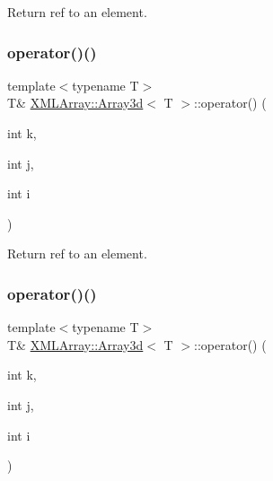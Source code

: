 Return ref to an element. 

\mbox{\label{classXMLArray_1_1Array3d_a2c17e47922ca191dbce50300c6dd6785}} 
\subsubsection{\texorpdfstring{operator()()}{operator()()}\hspace{0.1cm}{\footnotesize\ttfamily [2/6]}}
{\footnotesize\ttfamily template$<$typename T$>$ \\
T\& \mbox{\hyperlink{classXMLArray_1_1Array3d}{X\+M\+L\+Array\+::\+Array3d}}$<$ T $>$\+::operator() (\begin{DoxyParamCaption}\item[{int}]{k,  }\item[{int}]{j,  }\item[{int}]{i }\end{DoxyParamCaption})\hspace{0.3cm}{\ttfamily [inline]}}



Return ref to an element. 

\mbox{\label{classXMLArray_1_1Array3d_a2c17e47922ca191dbce50300c6dd6785}} 
\subsubsection{\texorpdfstring{operator()()}{operator()()}\hspace{0.1cm}{\footnotesize\ttfamily [3/6]}}
{\footnotesize\ttfamily template$<$typename T$>$ \\
T\& \mbox{\hyperlink{classXMLArray_1_1Array3d}{X\+M\+L\+Array\+::\+Array3d}}$<$ T $>$\+::operator() (\begin{DoxyParamCaption}\item[{int}]{k,  }\item[{int}]{j,  }\item[{int}]{i }\end{DoxyParamCaption})\hspace{0.3cm}{\ttfamily [inline]}}



